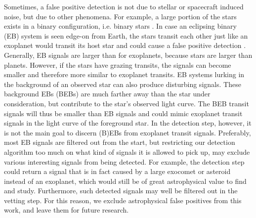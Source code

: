 Sometimes, a false positive detection is not due to stellar or spacecraft induced noise, but due to other phenomena. For example, a large portion of the stars exists in a binary configuration, i.e. binary stars \citep{kirk2016kepler}. In case an eclipsing binary (EB) system is seen edge-on from Earth, the stars transit each other just like an exoplanet would transit its host star and could cause a false positive detection \citep{osborn2020rapid}. Generally, EB signals are larger than for exoplanets, because stars are larger than planets. However, if the stars have grazing transits, the signals can become smaller and therefore more similar to exoplanet transits. EB systems lurking in the background of an observed star can also produce disturbing signals. These background EBs (BEBs) are much farther away than the star under consideration, but contribute to the star's observed light curve. The BEB transit signals will thus be smaller than EB signals and could mimic exoplanet transit signals in the light curve of the foreground star. In the detection step, however, it is not the main goal to discern (B)EBs from exoplanet transit signals. Preferably, most EB signals are filtered out from the start, but restricting our detection algorithm too much on what kind of signals it is allowed to pick up, may exclude various interesting signals from being detected. For example, the detection step could return a signal that is in fact caused by a large exocomet or asteroid instead of an exoplanet, which would still be of great astrophysical value to find and study. Furthermore, such detected signals may well be filtered out in the vetting step. For this reason, we exclude astrophysical false positives from this work, and leave them for future research.